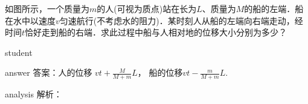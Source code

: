 \begin{example}
	如图所示，一个质量为$ m $的人(可视为质点)站在长为$ L $、质量为$ M $的船的左端．船在水中以速度$ v $匀速航行(不考虑水的阻力)．某时刻人从船的左端向右端走动，经时间$ t $恰好走到船的右端．求此过程中船与人相对地的位移大小分别为多少？
	
	\begin{taggedblock}{student}
		\vspace*{2cm}
	\end{taggedblock}
	
	
	\begin{taggedblock}{answer}
		答案：人的位移 $ vt+\frac{M}{M+m}L $， 船的位移$ vt-\frac{m}{M+m}L $.
	\end{taggedblock}
	
	
	\begin{taggedblock}{analysis}
		解析：
	\end{taggedblock}
\end{example}


